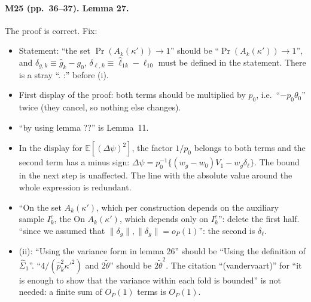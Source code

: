 \documentclass[11pt]{article}
\providecommand{\E}{\mathbb{E}}
\theoremstyle{plain}
\theoremstyle{remark}
\begin{document}
\paragraph{M25 (pp.~36--37). Lemma 27.} The proof is correct. Fix:
\begin{itemize}
\item Statement: ``the set $\Pr(A_k(\kappa'))\to1$'' should be
  ``$\Pr(A_k(\kappa'))\to1$'', and $\delta_{g,k}\equiv\hat g_k-g_0$,
  $\delta_{\ell,k}\equiv\hat\ell_{1k}-\ell_{10}$ must be defined in the statement.
  There is a stray ``. :'' before (i).
\item First display of the proof: both terms should be multiplied by $p_0$, i.e.\
  ``$-p_0\theta_0$'' twice (they cancel, so nothing else changes).
\item ``by using lemma ??'' is Lemma~11.
\item In the display for $\E[(\Delta\psi)^2]$, the factor $1/p_0$ belongs to both
  terms and the second term has a minus sign:
  $\Delta\psi=p_0^{-1}\{(w_g-w_0)V_1-w_g\delta_\ell\}$. The bound in the next step
  is unaffected. The line with the absolute value around the whole expression is
  redundant.
\item ``On the set $A_k(\kappa')$, which per construction depends on the
  auxiliary sample $I_k^c$, the On $A_k(\kappa')$, which depends only on
  $I_k^c$'': delete the first half. ``since we assumed that
  $\|\delta_g\|,\|\delta_g\|=o_P(1)$'': the second is $\delta_\ell$.
\item (ii): ``Using the variance form in lemma 26'' should be ``Using the
  definition of $\hat\Sigma_1$''. ``$4/(\hat p_k^2\kappa'^2)$ and $2\tilde\theta$''
  should be $2\tilde\theta^2$. The citation ``(vandervaart)'' for ``it is enough
  to show that the variance within each fold is bounded'' is not needed: a
  finite sum of $O_P(1)$ terms is $O_P(1)$.
\end{itemize}
\end{document}

